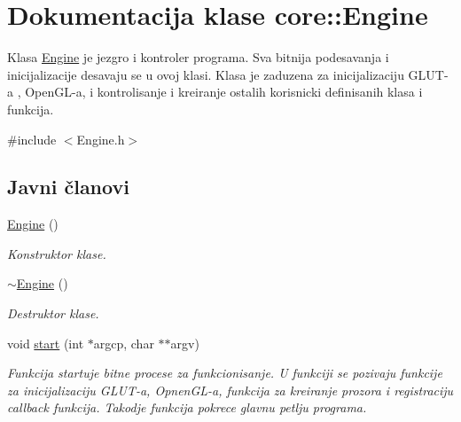 \hypertarget{classcore_1_1Engine}{}\section{Dokumentacija klase core\+:\+:Engine}
\label{classcore_1_1Engine}


Klasa \hyperlink{classcore_1_1Engine}{Engine} je jezgro i kontroler programa. Sva bitnija podesavanja i inicijalizacije desavaju se u ovoj klasi. Klasa je zaduzena za inicijalizaciju G\+L\+U\+T-\/a , Open\+G\+L-\/a, i kontrolisanje i kreiranje ostalih korisnicki definisanih klasa i funkcija.  




{\ttfamily \#include $<$Engine.\+h$>$}

\subsection*{Javni članovi}
\begin{DoxyCompactItemize}
\item 
\hyperlink{classcore_1_1Engine_adcfd692be68f28117c7234ae09fd0824}{Engine} ()
\begin{DoxyCompactList}\small\item\em Konstruktor klase. \end{DoxyCompactList}\item 
\hyperlink{classcore_1_1Engine_afadff2634c914c9f6c4ade95e78ff693}{$\sim$\+Engine} ()
\begin{DoxyCompactList}\small\item\em Destruktor klase. \end{DoxyCompactList}\item 
void \hyperlink{classcore_1_1Engine_ac0cb11890396ccdf5100bc73045c4d38}{start} (int $\ast$argcp, char $\ast$$\ast$argv)
\begin{DoxyCompactList}\small\item\em Funkcija startuje bitne procese za funkcionisanje. U funkciji se pozivaju funkcije za inicijalizaciju G\+L\+U\+T-\/a, Opnen\+G\+L-\/a, funkcija za kreiranje prozora i registraciju callback funkcija. Takodje funkcija pokrece glavnu petlju programa. \end{DoxyCompactList}\end{DoxyCompactItemize}

